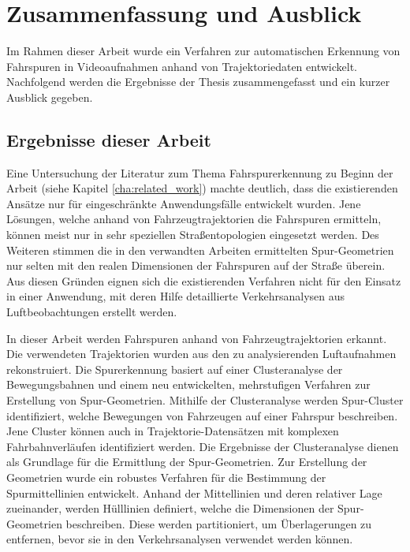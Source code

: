 
\chapter{Zusammenfassung und Ausblick}
\label{cha:end}

Im Rahmen dieser Arbeit wurde ein Verfahren zur automatischen Erkennung von Fahrspuren in Videoaufnahmen
anhand von Trajektoriedaten entwickelt.
Nachfolgend werden die Ergebnisse der Thesis zusammengefasst und ein kurzer Ausblick gegeben.

\section{Ergebnisse dieser Arbeit}

Eine Untersuchung der Literatur zum Thema Fahrspurerkennung zu Beginn der Arbeit
(siehe Kapitel \ref{cha:related_work}) machte deutlich, dass die existierenden Ansätze 
nur für eingeschränkte Anwendungsfälle entwickelt wurden. 
Jene Lösungen, welche anhand von Fahrzeugtrajektorien die Fahrspuren ermitteln, können meist nur
in sehr speziellen Straßentopologien eingesetzt werden.
Des Weiteren stimmen die in den verwandten Arbeiten ermittelten Spur-Geometrien nur selten mit den
realen Dimensionen der Fahrspuren auf der Straße überein.
Aus diesen Gründen eignen sich die existierenden Verfahren nicht für den Einsatz in einer
Anwendung, mit deren Hilfe detaillierte Verkehrsanalysen aus Luftbeobachtungen erstellt werden.

In dieser Arbeit werden Fahrspuren anhand von Fahrzeugtrajektorien erkannt. Die verwendeten Trajektorien
wurden aus den zu analysierenden Luftaufnahmen rekonstruiert.
Die Spurerkennung basiert auf einer Clusteranalyse der Bewegungsbahnen
und einem neu entwickelten, mehrstufigen Verfahren zur Erstellung von Spur-Geometrien.
Mithilfe der Clusteranalyse werden Spur-Cluster identifiziert, welche Bewegungen von Fahrzeugen auf einer Fahrspur beschreiben.
Jene Cluster können auch in Trajektorie-Datensätzen mit komplexen Fahrbahnverläufen identifiziert werden.
Die Ergebnisse der Clusteranalyse dienen als Grundlage für die Ermittlung der Spur-Geometrien.
Zur Erstellung der Geometrien wurde ein robustes Verfahren für die Bestimmung der Spurmittellinien entwickelt.
Anhand der Mittellinien und deren relativer Lage zueinander, werden Hülllinien definiert,
welche die Dimensionen der Spur-Geometrien beschreiben. Diese werden partitioniert,
um Überlagerungen zu entfernen, bevor sie in den Verkehrsanalysen verwendet werden können.

